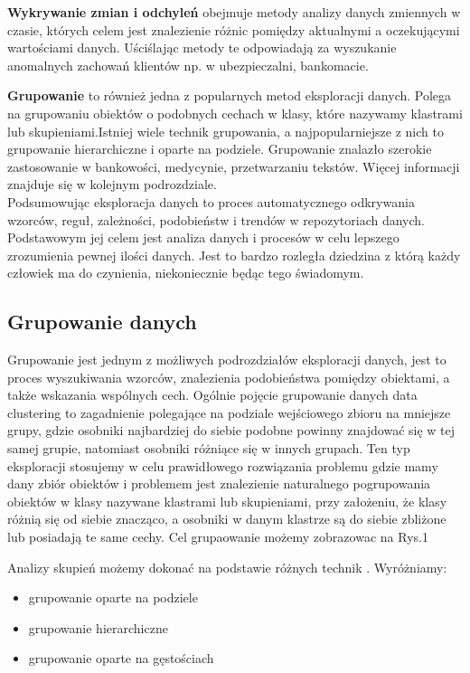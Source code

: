 \documentclass[twoside]{pracaMagisterskaMS}
\begin{document}
\textbf{Wykrywanie zmian i odchyleń} obejmuje metody  analizy danych zmiennych w czasie, których celem jest znalezienie różnic pomiędzy aktualnymi a oczekującymi wartościami danych. Uściślając metody te odpowiadają za wyszukanie anomalnych zachowań klientów np. w ubezpieczalni, bankomacie.

\textbf{Grupowanie} to również jedna z popularnych metod eksploracji danych. Polega na grupowaniu obiektów o podobnych cechach w klasy, które nazywamy klastrami lub skupieniami.Istniej wiele technik grupowania, a najpopularniejsze z nich to grupowanie hierarchiczne i oparte na podziele. Grupowanie znalazło szerokie zastosowanie w bankowości, medycynie, przetwarzaniu tekstów. Więcej informacji znajduje się w kolejnym podrozdziale.\\

Podsumowując eksploracja danych to proces automatycznego odkrywania wzorców, reguł, zależności, podobieństw i trendów w repozytoriach danych. Podstawowym jej celem jest analiza danych i procesów w celu lepszego zrozumienia pewnej ilości danych. Jest to bardzo rozległa dziedzina z którą każdy człowiek ma do czynienia, niekoniecznie będąc tego świadomym. 

\subsection{Grupowanie danych}
Grupowanie jest jednym z możliwych podrozdziałów eksploracji danych, jest to proces wyszukiwania wzorców, znalezienia podobieństwa pomiędzy obiektami, a także wskazania wspólnych cech. Ogólnie pojęcie grupowanie danych data clustering to zagadnienie polegające na podziale wejściowego zbioru na mniejsze grupy, gdzie osobniki najbardziej do siebie podobne powinny znajdować się w tej samej grupie, natomiast osobniki różniące się  w innych grupach. Ten typ eksploracji stosujemy w celu prawidłowego rozwiązania problemu gdzie mamy dany zbiór obiektów i problemem jest znalezienie naturalnego pogrupowania obiektów w klasy nazywane klastrami lub skupieniami, przy założeniu, że  klasy różnią się od siebie znacząco, a osobniki w danym klastrze są do siebie zbliżone lub posiadają te same cechy. 
Cel grupaowanie możemy zobrazowac na Rys.1

Analizy skupień możemy dokonać na podstawie różnych technik \cite{grupowanie1}. Wyróżniamy:
\begin{itemize}
\item grupowanie oparte na podziele 
\item grupowanie hierarchiczne
\item grupowanie oparte na gęstościach
\end{itemize}
\end{document}

